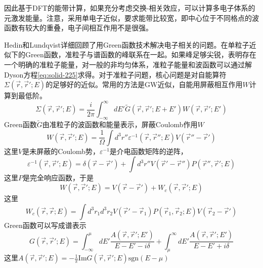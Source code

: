 因此基于DFT的能带计算，如果充分考虑交换-相关效应，可以计算多电子体系的元激发能量。注意，采用单电子近似，要求能带比较宽，即中心位于不同格点的波函数有较大的重叠，电子间相互作用不是很强。

Hedin和Lundqvist详细回顾了用Green函数技术解决电子相关的问题\cite{Hedin-Lundqvist}。在单粒子近似下的Green函数，准粒子与谱函数的峰联系在一起。如果峰足够尖锐，表明存在一个明确的准粒子能量，对一般的非均匀体系，准粒子能量和波函数可以通过解Dyson方程\eqref{eq:solid-225}求得。对于准粒子问题，核心问题是对自能算符$\Sigma(\vec r,\vec r';E)$的足够好的近似。常用的方法是GW近似\cite{PR139-A796_1965}，自能用屏蔽相互作用$W$计算到最低阶。
\begin{equation}
  \Sigma(\vec r,\vec r';E)=\frac i{2\pi}\int_{-\infty}^{\infty}dE'\tilde G(\vec r,\vec r';E+E')W(\vec r,\vec r';E')
  \label{eq:solid-229}
\end{equation}
Green函数$\tilde G$由准粒子的波函数和能量表示，屏蔽Coulomb作用$W$
\begin{equation}
  W(\vec r,\vec r';E)=\frac1{\Omega}\int d^3r''\varepsilon^{-1}(\vec r,\vec r'';E)V(\vec r''-\vec r')
  \label{eq:solid-230}
\end{equation}
这里$V$是未屏蔽的Coulomb势，$\varepsilon^{-1}$是介电函数矩阵的逆阵，
\begin{equation}
  \varepsilon^{-1}(\vec r,\vec r';E)=\delta(\vec r-\vec r')+\int d^3r''V(\vec r'-\vec r'')P(\vec r'',\vec r';E)
  \label{eq:solid-231}
\end{equation}
这里$P$是完全响应函数，于是
\begin{equation}
  W(\vec r,\vec r';E)=V(\vec r-\vec r')+W_c(\vec r,\vec r';E)
  \label{eq:solid-232}
\end{equation}
这里
\begin{equation}
  W_c(\vec r,\vec r;E)=\int d^3r_1d^3r_2V(\vec r'-\vec r_1)P(\vec r_1,\vec r_2;E)V(\vec r_2-\vec r')
  \label{eq:solid-233}
\end{equation}
Green函数可以写成谱表示
\begin{equation}
  G(\vec r,\vec r';E)=\int_{-\infty}^{\mu}dE'\frac{A(\vec r,\vec r';E')}{E-E'-i\delta}+\int_{\mu}^{\infty}dE'\frac{A(\vec r,\vec r';E')}{E-E'+i\delta}
  \label{eq:solid-234}
\end{equation}
这里$A(\vec r,\vec r';E)=-\frac1{\pi}\mathrm{Im}G(\vec r,\vec r';E)\mathrm{sgn}(E-\mu)$

